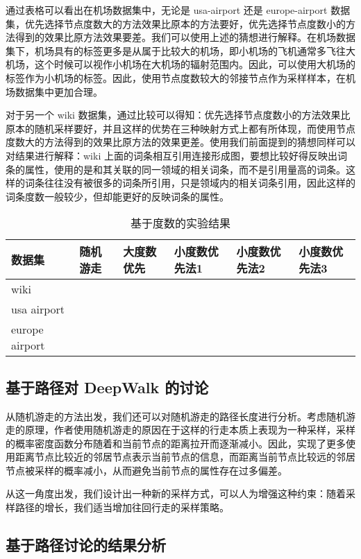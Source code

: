 \documentclass{ctexart}
\begin{document}
通过表格可以看出在机场数据集中，无论是 usa-airport 还是 europe-airport 数据集，优先选择节点度数大的方法效果比原本的方法要好，优先选择节点度数小的方法得到的效果比原方法效果要差。我们可以使用上述的猜想进行解释。在机场数据集下，机场具有的标签更多是从属于比较大的机场，即小机场的飞机通常多飞往大机场，这个时候可以视作小机场在大机场的辐射范围内。因此，可以使用大机场的标签作为小机场的标签。因此，使用节点度数较大的邻接节点作为采样样本，在机场数据集中更加合理。

对于另一个 wiki 数据集，通过比较可以得知：优先选择节点度数小的方法效果比原本的随机采样要好，并且这样的优势在三种映射方式上都有所体现，而使用节点度数大的方法得到的效果比原方法的效果更差。使用我们前面提到的猜想同样可以对结果进行解释：wiki 上面的词条相互引用连接形成图，要想比较好得反映出词条的属性，使用的是和其关联的同一领域的相关词条，而不是引用量高的词条。这样的词条往往没有被很多的词条所引用，只是领域内的相关词条引用，因此这样的词条度数一般较少，但却能更好的反映词条的属性。

\begin{table}[!t]
\renewcommand{\arraystretch}{1.1}
\caption{基于度数的实验结果}
\label{exp: deg result}
\centering
\begin{tabular}{|l|l|l|l|l|l|} %
    \hline
    数据集 & 随机游走 & 大度数优先 & 小度数优先法1 & 小度数优先法2 & 小度数优先法3 \\
    \hline
    wiki \\
    \hline
    usa airport \\
    \hline
    europe airport \\
    \hline
\end{tabular}
\end{table}

\subsection{基于路径对 DeepWalk 的讨论}

从随机游走的方法出发，我们还可以对随机游走的路径长度进行分析。考虑随机游走的原理，作者使用随机游走的原因在于这样的行走本质上表现为一种采样，采样的概率密度函数分布随着和当前节点的距离拉开而逐渐减小。因此，实现了更多使用距离节点比较近的邻居节点表示当前节点的信息，而距离当前节点比较远的邻居节点被采样的概率减小，从而避免当前节点的属性存在过多偏差。

从这一角度出发，我们设计出一种新的采样方式，可以人为增强这种约束：随着采样路径的增长，我们适当增加往回行走的采样策略。

\subsection{基于路径讨论的结果分析}
\end{document}
